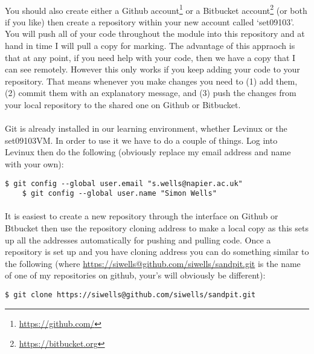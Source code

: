 \documentclass[12pt, a4paper, twoside]{book}
\begin{document}
\paragraph{} You should also create either a Github account\footnote{\url{https://github.com/}} or a Bitbucket account\footnote{\url{https://bitbucket.org}} (or both if you like) then create a repository within your new account called `set09103'. You will push all of your code throughout the module into this repository and at hand in time I will pull a copy for marking. The advantage of this appraoch is that at any point, if you need help with your code, then we have a copy that I can see remotely. However this only works if you keep adding your code to your repository. That means whenever you make changes you need to (1) add them, (2) commit them with an explanatory message,  and (3) push the changes from your local repository to the shared one on Github or Bitbucket.


\paragraph{} Git is already installed in our learning environment, whether Levinux or the set09103VM. In order to use it we have to do a couple of things. Log into Levinux then do the following (obviously replace my email address and name with your own):
\begin{lstlisting}[style=DOS]
    $ git config --global user.email "s.wells@napier.ac.uk"
    $ git config --global user.name "Simon Wells"
\end{lstlisting}

\paragraph{} It is easiest to create a new repository through the interface on Github or Btbucket then use the repository cloning address to make a local copy as this sets up all the addresses automatically for pushing and pulling code. Once a repository is set up and you have cloning address you can do something similar to the following (where \url{https://siwells@github.com/siwells/sandpit.git} is the name of one of my repositories on github, your's will obviously be different):

\begin{lstlisting}[style=DOS]
    $ git clone https://siwells@github.com/siwells/sandpit.git
\end{lstlisting}
\end{document}
